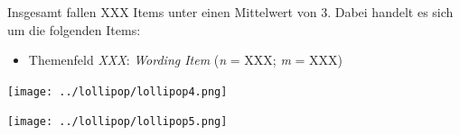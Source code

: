\documentclass[11pt]{article}
\begin{document}
\noindent
Insgesamt fallen XXX Items unter einen Mittelwert von 3. Dabei handelt es sich um die folgenden Items:
\begin{itemize}
      \item Themenfeld \textit{XXX}: \textit{Wording Item} (\textit{n} = XXX; \textit{m} = XXX)
\end{itemize}

\texttt{[image: ../lollipop/lollipop4.png]}

\texttt{[image: ../lollipop/lollipop5.png]}
\end{document}
